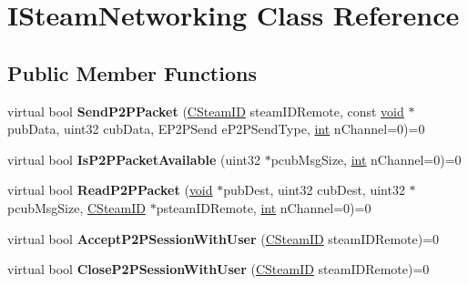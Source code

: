 \hypertarget{classISteamNetworking}{}\section{I\+Steam\+Networking Class Reference}
\label{classISteamNetworking}
\subsection*{Public Member Functions}
\begin{DoxyCompactItemize}
\item 
\hypertarget{classISteamNetworking_a133b68cf61ed66ad1ab615413bd69d7a}{}virtual bool {\bfseries Send\+P2\+P\+Packet} (\hyperlink{classCSteamID}{C\+Steam\+I\+D} steam\+I\+D\+Remote, const \hyperlink{SDL__audio_8h_a52835ae37c4bb905b903cbaf5d04b05f}{void} $\ast$pub\+Data, uint32 cub\+Data, E\+P2\+P\+Send e\+P2\+P\+Send\+Type, \hyperlink{SDL__thread_8h_a6a64f9be4433e4de6e2f2f548cf3c08e}{int} n\+Channel=0)=0\label{classISteamNetworking_a133b68cf61ed66ad1ab615413bd69d7a}

\item 
\hypertarget{classISteamNetworking_a414d0488d95bd4540c2752d45c05a14e}{}virtual bool {\bfseries Is\+P2\+P\+Packet\+Available} (uint32 $\ast$pcub\+Msg\+Size, \hyperlink{SDL__thread_8h_a6a64f9be4433e4de6e2f2f548cf3c08e}{int} n\+Channel=0)=0\label{classISteamNetworking_a414d0488d95bd4540c2752d45c05a14e}

\item 
\hypertarget{classISteamNetworking_a171241063c2e7f0d0aad97ba286f52c4}{}virtual bool {\bfseries Read\+P2\+P\+Packet} (\hyperlink{SDL__audio_8h_a52835ae37c4bb905b903cbaf5d04b05f}{void} $\ast$pub\+Dest, uint32 cub\+Dest, uint32 $\ast$pcub\+Msg\+Size, \hyperlink{classCSteamID}{C\+Steam\+I\+D} $\ast$psteam\+I\+D\+Remote, \hyperlink{SDL__thread_8h_a6a64f9be4433e4de6e2f2f548cf3c08e}{int} n\+Channel=0)=0\label{classISteamNetworking_a171241063c2e7f0d0aad97ba286f52c4}

\item 
\hypertarget{classISteamNetworking_a9d25d344ffcb1c53e367ff810f36b79c}{}virtual bool {\bfseries Accept\+P2\+P\+Session\+With\+User} (\hyperlink{classCSteamID}{C\+Steam\+I\+D} steam\+I\+D\+Remote)=0\label{classISteamNetworking_a9d25d344ffcb1c53e367ff810f36b79c}

\item 
\hypertarget{classISteamNetworking_a7d6845b453e676fc9e476c1d94b3d725}{}virtual bool {\bfseries Close\+P2\+P\+Session\+With\+User} (\hyperlink{classCSteamID}{C\+Steam\+I\+D} steam\+I\+D\+Remote)=0\label{classISteamNetworking_a7d6845b453e676fc9e476c1d94b3d725}


\end{DoxyCompactItemize}
